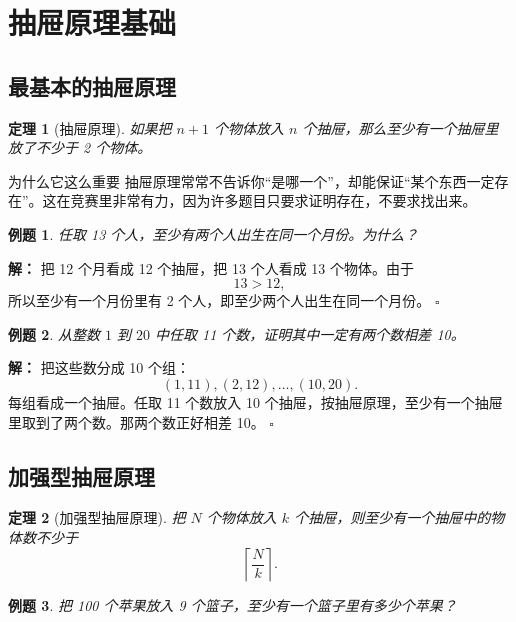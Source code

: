 \documentclass[11pt,a4paper,fontset=fandol]{ctexart}
\theoremstyle{formaltheorem}
\newtheorem{theorem}{定理}[section]
\theoremstyle{formalexample}
\newtheorem{example}{例题}[section]
\newenvironment{solution}{\par\noindent\textbf{解：}}{\hfill$\square$\par}
\begin{document}
\section{抽屉原理基础}

\subsection{最基本的抽屉原理}
\begin{theorem}[抽屉原理]
如果把 $n+1$ 个物体放入 $n$ 个抽屉，那么至少有一个抽屉里放了不少于 2 个物体。
\end{theorem}

\begin{notebox}{为什么它这么重要}
抽屉原理常常不告诉你“是哪一个”，却能保证“某个东西一定存在”。这在竞赛里非常有力，因为许多题目只要求证明存在，不要求找出来。
\end{notebox}

\begin{example}
任取 13 个人，至少有两个人出生在同一个月份。为什么？
\end{example}

\begin{solution}
把 12 个月看成 12 个抽屉，把 13 个人看成 13 个物体。由于
\[
13>12,
\]
所以至少有一个月份里有 2 个人，即至少两个人出生在同一个月份。
\end{solution}

\begin{example}
从整数 $1$ 到 $20$ 中任取 11 个数，证明其中一定有两个数相差 10。
\end{example}

\begin{solution}
把这些数分成 10 个组：
\[
(1,11),(2,12),\ldots,(10,20).
\]
每组看成一个抽屉。任取 11 个数放入 10 个抽屉，按抽屉原理，至少有一个抽屉里取到了两个数。那两个数正好相差 10。
\end{solution}

\subsection{加强型抽屉原理}
\begin{theorem}[加强型抽屉原理]
把 $N$ 个物体放入 $k$ 个抽屉，则至少有一个抽屉中的物体数不少于
\[
\left\lceil \frac{N}{k}\right\rceil.
\]
\end{theorem}

\begin{example}
把 100 个苹果放入 9 个篮子，至少有一个篮子里有多少个苹果？
\end{example}
\end{document}
